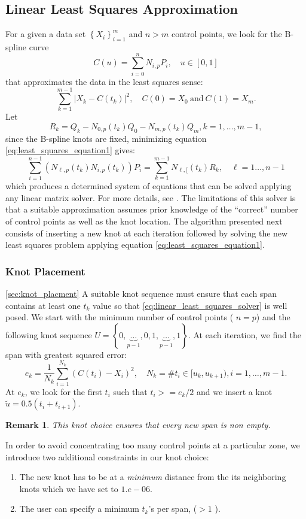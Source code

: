 \documentclass[a4paper,12pt]{article}
\newtheorem{remark}{Remark}[section]
\begin{document}
\subsection{Linear Least Squares Approximation}
For a given a data set $\left\{X_i\right\}_{i=1}^m$ and $n>m$ control points, we look for the B-spline curve 
\begin{equation}
 C(u) = \sum_{i=0}^n N_{i,p} P_i,\quad u\in[0,1]
\end{equation}\label{eq:least_squares_equation1}
that approximates the data in the least squares sense:
$$
\sum _{k= 1}^{m-1}\left | X_k - C(t_k)\right|^2,\quad C(0)= X_0\ \text {and}\  C(1) = X_m.
$$
Let 
$$
 R_k = Q_k - N_{0,p}(t_k)Q_0 - N_{m,p}(t_k)Q_m,  k = 1,\ldots, m-1, 
$$
since the B-spline knots are fixed, minimizing equation \eqref{eq:least_squares_equation1} gives:
\begin{equation}\label{eq:linear_least_squares_solver}
 \sum_{i=1}^{n-1} \left(N_{\ell, p}(t_k)N_{i,p}(t_k)\right)P_i= \sum_{k=1}^{m-1}N_{\ell,[}(t_k)R_k, \quad \ell= 1\ldots, n-1
\end{equation}
 which produces a determined system of equations that can be solved applying any linear matrix solver. For more details, see \cite{nurbs_book}.
The limitations of this solver is that a suitable approximation assumes prior knowledge of the ``correct'' number of control points as well as the knot 
location. The algorithm presented next consists of inserting a new knot at 
each iteration followed by solving the new least squares problem applying equation \eqref{eq:least_squares_equation1}. 

\subsubsection{Knot Placement}\ref{sec:knot_placment}
A suitable knot sequence must ensure that each span contains at least one $t_k$ value so that \eqref{eq:linear_least_squares_solver} is well posed. 
We start with the minimum number of control points ( $n = p$) and the following knot sequence 
$U=\left\{0,\underbrace{\ldots}_{p-1},0,1,\underbrace{\ldots}_{p-1},1\right\}$. 
 At each iteration, we find the span with greatest squared error: 
 $$e_k = \frac{1}{N_k}\sum_{i=1}^{N_k} (C(t_i) - X_i)^2,\quad N_k = \# t_i\in [u_k, u_{k+1}), i=1,\ldots,m-1.$$
At $e_k$, we look for the first $t_i$ such that $t_i >= e_k/2$ and we insert a knot $\tilde u = 0.5(t_i+t_{i+1})$. 
 \begin{remark}
  This knot choice ensures that every new span is non empty. 
 \end{remark}
In order to avoid concentrating too many control points at a particular zone, we introduce two additional 
constraints in our knot choice:
\begin{enumerate}
 \item The new knot has to be at a \emph{minimum} distance from the its neighboring knots which we have set to $1.e-06$. 
 \item The user can specify a minimum $t_k$'s per span, ($>1$ ). 
\end{enumerate}
\end{document}
